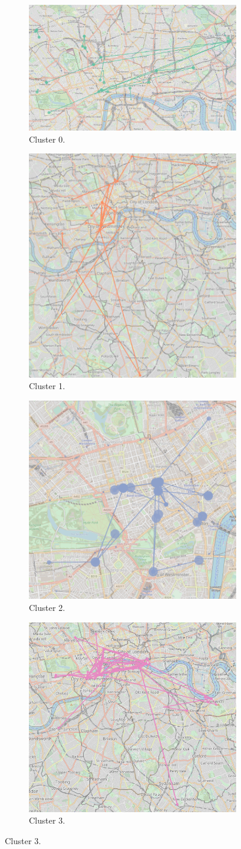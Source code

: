\documentclass{article}
\theoremstyle{definition}
\theoremstyle{remark}
\begin{document}
\begin{figure}[!h]

\centering
\begin{subfigure}{0.6\textheight}
\centering
\includegraphics[width=0.4\linewidth]{figures/daytime_tourists_c0.png}
\caption{Cluster 0.}
\label{fig:daytime_tourists_c0}
\end{subfigure}
\begin{subfigure}{0.6\textheight}
\centering
\includegraphics[width=0.4\linewidth]{figures/daytime_tourists_c1.png}
\caption{Cluster 1.}
\label{fig:daytime_tourists_c1}
\end{subfigure}
\begin{subfigure}{0.6\textheight}
\centering
\includegraphics[width=0.4\linewidth]{figures/daytime_tourists_c2.png}
\caption{Cluster 2.}
\label{fig:daytime_tourists_c2}
\end{subfigure}
\begin{subfigure}{0.6\textheight}
\centering
\includegraphics[width=0.4\linewidth]{figures/daytime_tourists_c3.png}
\caption{Cluster 3.}
\label{fig:daytime_tourists_c3}
\end{subfigure}


\end{figure}
\end{document}
